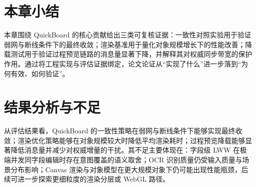 \section{本章小结}
本章围绕 QuickBoard 的核心贡献给出三类可复核证据：一致性对照实验用于验证弱网与断线条件下的最终收敛；渲染基准用于量化对象规模增长下的性能改善；降载测试用于验证过程预览链路的消息量显著下降，并解释其对权威同步带宽的保护作用。通过将工程实现与评估证据绑定，论文论证从“实现了什么”进一步落到“为何有效、如何验证”。

\section{结果分析与不足}
从评估结果看，QuickBoard 的一致性策略在弱网与断线条件下能够实现最终收敛；渲染优化策略能够在对象规模较大时降低平均渲染耗时；过程预览降载能够显著降低消息量并减少对权威增量的干扰。其不足主要体现在：字段级 LWW 在极端并发同字段编辑时存在意图覆盖的语义取舍；OCR 识别质量仍受输入质量与场景分布影响；Canvas 渲染与对象模型在更大规模对象下仍可能出现性能瓶颈，后续可进一步探索更细粒度的渲染分层或 WebGL 路径。
